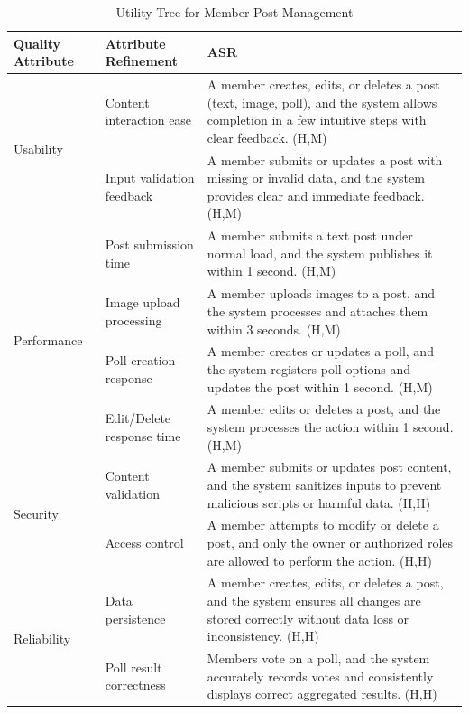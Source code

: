 \documentclass{article}
\begin{document}
\begin{table}[H]
\centering
\caption{Utility Tree for Member Post Management}
\begin{tabular}{|p{3cm}|p{4cm}|p{7cm}|}
\hline
\textbf{Quality Attribute} & \textbf{Attribute Refinement} & \textbf{ASR} \\
\hline

\multirow{2}{*}{Usability}
& Content interaction ease
& A member creates, edits, or deletes a post (text, image, poll), and the system allows completion in a few intuitive steps with clear feedback. (H,M) \\
\cline{2-3}
& Input validation feedback
& A member submits or updates a post with missing or invalid data, and the system provides clear and immediate feedback. (H,M) \\
\hline

\multirow{4}{*}{Performance}
& Post submission time
& A member submits a text post under normal load, and the system publishes it within 1 second. (H,M) \\
\cline{2-3}
& Image upload processing
& A member uploads images to a post, and the system processes and attaches them within 3 seconds. (H,M) \\
\cline{2-3}
& Poll creation response
& A member creates or updates a poll, and the system registers poll options and updates the post within 1 second. (H,M) \\
\cline{2-3}
& Edit/Delete response time
& A member edits or deletes a post, and the system processes the action within 1 second. (H,M) \\
\hline

\multirow{2}{*}{Security}
& Content validation
& A member submits or updates post content, and the system sanitizes inputs to prevent malicious scripts or harmful data. (H,H) \\
\cline{2-3}
& Access control
& A member attempts to modify or delete a post, and only the owner or authorized roles are allowed to perform the action. (H,H) \\
\hline

\multirow{2}{*}{Reliability}
& Data persistence
& A member creates, edits, or deletes a post, and the system ensures all changes are stored correctly without data loss or inconsistency. (H,H) \\
\cline{2-3}
& Poll result correctness
& Members vote on a poll, and the system accurately records votes and consistently displays correct aggregated results. (H,H) \\
\hline


\end{tabular}
\end{table}
\end{document}
